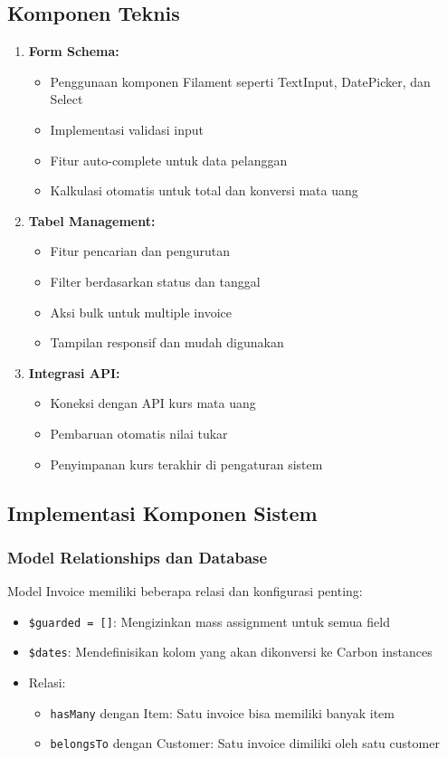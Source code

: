 \documentclass[a4paper]{report}
\begin{document}
\subsection{Komponen Teknis}
\begin{enumerate}
\item \textbf{Form Schema:}
    \begin{itemize}
    \item Penggunaan komponen Filament seperti TextInput, DatePicker, dan Select
    \item Implementasi validasi input
    \item Fitur auto-complete untuk data pelanggan
    \item Kalkulasi otomatis untuk total dan konversi mata uang
    \end{itemize}

\item \textbf{Tabel Management:}
    \begin{itemize}
    \item Fitur pencarian dan pengurutan
    \item Filter berdasarkan status dan tanggal
    \item Aksi bulk untuk multiple invoice
    \item Tampilan responsif dan mudah digunakan
    \end{itemize}

\item \textbf{Integrasi API:}
    \begin{itemize}
    \item Koneksi dengan API kurs mata uang
    \item Pembaruan otomatis nilai tukar
    \item Penyimpanan kurs terakhir di pengaturan sistem
    \end{itemize}
\end{enumerate}

\subsection{Implementasi Komponen Sistem}

\subsubsection{Model Relationships dan Database}
Model Invoice memiliki beberapa relasi dan konfigurasi penting:
\begin{itemize}
\item \texttt{\$guarded = []}: Mengizinkan mass assignment untuk semua field
\item \texttt{\$dates}: Mendefinisikan kolom yang akan dikonversi ke Carbon instances
\item Relasi:
    \begin{itemize}
    \item \texttt{hasMany} dengan Item: Satu invoice bisa memiliki banyak item
    \item \texttt{belongsTo} dengan Customer: Satu invoice dimiliki oleh satu customer
    \end{itemize}
\end{itemize}
\end{document}
